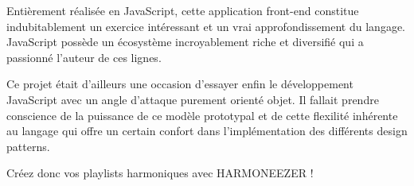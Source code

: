 \documentclass[a4paper,12pt]{article}
\begin{document}
Entièrement réalisée en JavaScript, cette application front-end constitue indubitablement un exercice intéressant et un vrai approfondissement du langage. JavaScript possède un écosystème incroyablement riche et diversifié qui a passionné l'auteur de ces lignes.

Ce projet était d'ailleurs une occasion d'essayer enfin le développement JavaScript avec un angle d'attaque purement orienté objet. Il fallait prendre conscience de la puissance de ce modèle prototypal et de cette flexilité inhérente au langage qui offre un certain confort dans l'implémentation des différents design patterns.

Créez donc vos playlists harmoniques avec HARMONEEZER !
\end{document}
